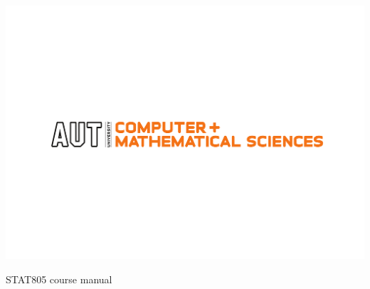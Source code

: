 
\includegraphics{AUT_COMP_MATH_CMYK}

\begin{centering}
{\Huge STAT805 course manual}
\end{centering}



